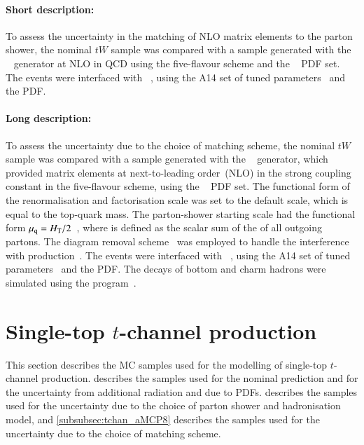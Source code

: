 \paragraph{Short description:}

To assess the uncertainty in the matching of NLO matrix elements to the
parton shower, the nominal \(tW\) sample was compared with a sample generated
with the \MGNLO[2.6.2]~\cite{Alwall:2014hca} generator at NLO in QCD using the five-flavour
scheme and the \NNPDF[2.3nlo]~\cite{Ball:2014uwa} PDF set. The events were
interfaced with \PYTHIA[8.230]~\cite{Sjostrand:2014zea}, using the A14
set of tuned parameters~\cite{ATL-PHYS-PUB-2014-021} and the \NNPDF[2.3lo]
PDF.


\paragraph{Long description:}

To assess the uncertainty due to the choice of matching scheme, the nominal \(tW\) sample was compared with a sample generated
with the \MGNLO[2.6.2]~\cite{Alwall:2014hca} generator, which provided matrix elements at next-to-leading order~(NLO) in the strong coupling constant \alphas
in the five-flavour scheme, using the \NNPDF[2.3nlo]~\cite{Ball:2014uwa} PDF set.
The functional form of the renormalisation and factorisation scale was set to the default scale, which is equal to the top-quark mass.
The parton-shower starting scale had the functional form \(\mu_\mathrm{q} = H_{\text{T}}/2\)~\cite{ATL-PHYS-PUB-2017-007},
where \HT is defined as the scalar sum of the \pT of all outgoing partons.
The diagram removal scheme~\cite{Frixione:2008yi} was employed to handle the interference with \ttbar production~\cite{ATL-PHYS-PUB-2016-020}.
The events were interfaced with \PYTHIA[8.230]~\cite{Sjostrand:2014zea}, using the A14 set of tuned parameters~\cite{ATL-PHYS-PUB-2014-021}
and the \NNPDF[2.3lo] PDF.
The decays of bottom and charm hadrons were simulated using the \EVTGEN[1.6.0] program~\cite{Lange:2001uf}.


\section{Single-top \texorpdfstring{\(t\)}{t}-channel production}
\label{subsec:tchan}

This section describes the MC samples used for the modelling of single-top \(t\)-channel production.
 describes the \POWPY[8] samples used for the nominal prediction
and for the uncertainty from additional radiation and due to PDFs.
 describes the \POWHER[7] samples used for the uncertainty due to the choice of parton shower and hadronisation model,
and \cref{subsubsec:tchan_aMCP8} describes the \MGNLOPY[8] samples used for the uncertainty due to the choice of matching scheme.

